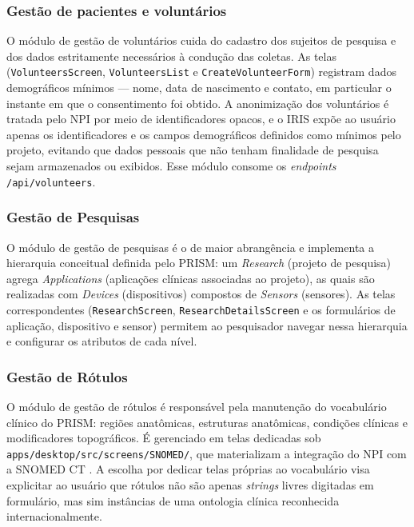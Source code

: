 \subsubsection{Gestão de pacientes e voluntários}\label{subsubsec:IRISPacientes}

O módulo de gestão de voluntários cuida do cadastro dos sujeitos de pesquisa e dos dados estritamente necessários à condução das coletas. As telas (\texttt{VolunteersScreen}, \texttt{VolunteersList} e \texttt{CreateVolunteerForm}) registram dados demográficos mínimos --- nome, data de nascimento e contato, em particular o instante em que o consentimento foi obtido. A anonimização dos voluntários é tratada pelo NPI por meio de identificadores opacos, e o IRIS expõe ao usuário apenas os identificadores e os campos demográficos definidos como mínimos pelo projeto, evitando que dados pessoais que não tenham finalidade de pesquisa sejam armazenados ou exibidos. Esse módulo consome os \textit{endpoints} \texttt{/api/volunteers}.

\subsubsection{Gestão de Pesquisas}\label{subsubsec:IRISPesquisas}

O módulo de gestão de pesquisas é o de maior abrangência e implementa a hierarquia conceitual definida pelo PRISM: um \textit{Research} (projeto de pesquisa) agrega \textit{Applications} (aplicações clínicas associadas ao projeto), as quais são realizadas com \textit{Devices} (dispositivos) compostos de \textit{Sensors} (sensores). As telas correspondentes (\texttt{ResearchScreen}, \texttt{ResearchDetailsScreen} e os formulários de aplicação, dispositivo e sensor) permitem ao pesquisador navegar nessa hierarquia e configurar os atributos de cada nível.

\subsubsection{Gestão de Rótulos}\label{subsubsec:IRISRotulos}

O módulo de gestão de rótulos é responsável pela manutenção do vocabulário clínico do PRISM: regiões anatômicas, estruturas anatômicas, condições clínicas e modificadores topográficos. É gerenciado em telas dedicadas sob \texttt{apps/desktop/src/screens/SNOMED/}, que materializam a integração do NPI com a SNOMED CT \cite{SNOMEDCT}. A escolha por dedicar telas próprias ao vocabulário visa explicitar ao usuário que rótulos não são apenas \textit{strings} livres digitadas em formulário, mas sim instâncias de uma ontologia clínica reconhecida internacionalmente.

